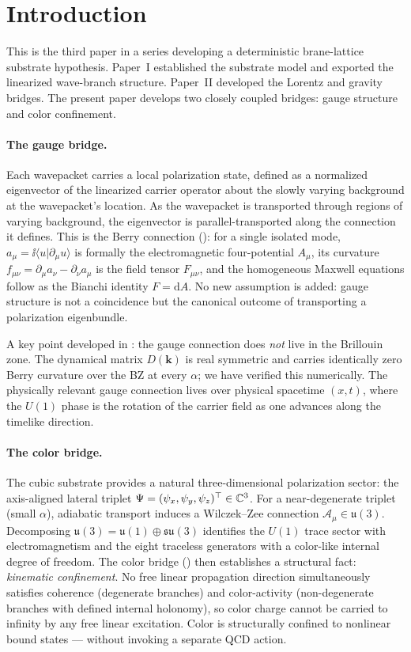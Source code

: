 \section{Introduction}
\label{sec:introduction}

This is the third paper in a series developing a deterministic brane-lattice substrate hypothesis.
Paper~I established the substrate model and exported the linearized wave-branch structure.
Paper~II developed the Lorentz and gravity bridges.
The present paper develops two closely coupled bridges: gauge structure and color confinement.

\paragraph{The gauge bridge.}
Each wavepacket carries a local polarization state, defined as a normalized eigenvector of the
linearized carrier operator about the slowly varying background at the wavepacket's location.
As the wavepacket is transported through regions of varying background, the eigenvector is
parallel-transported along the connection it defines.
This is the Berry connection (): for a single isolated mode,
$a_\mu = \ii\langle u|\partial_\mu u\rangle$ is formally the electromagnetic four-potential
$A_\mu$, its curvature $f_{\mu\nu} = \partial_\mu a_\nu - \partial_\nu a_\mu$ is the field tensor
$F_{\mu\nu}$, and the homogeneous Maxwell equations follow as the Bianchi identity $F = \mathrm{d}A$.
No new assumption is added: gauge structure is not a coincidence but the canonical outcome of
transporting a polarization eigenbundle.

A key point developed in : the gauge connection does \emph{not} live in the
Brillouin zone.
The dynamical matrix $D(\mathbf{k})$ is real symmetric and carries identically zero Berry curvature
over the BZ at every $\alpha$; we have verified this numerically.
The physically relevant gauge connection lives over physical spacetime $(x,t)$, where the $U(1)$
phase is the rotation of the carrier field as one advances along the timelike direction.

\paragraph{The color bridge.}
The cubic substrate provides a natural three-dimensional polarization sector: the axis-aligned
lateral triplet $\Psi=(\psi_x,\psi_y,\psi_z)^\top\in\mathbb{C}^3$.
For a near-degenerate triplet (small $\alpha$), adiabatic transport induces a Wilczek--Zee
connection $\mathcal{A}_\mu\in\mathfrak{u}(3)$.
Decomposing $\mathfrak{u}(3)=\mathfrak{u}(1)\oplus\mathfrak{su}(3)$ identifies the $U(1)$ trace
sector with electromagnetism and the eight traceless generators with a color-like internal degree of
freedom.
The color bridge () then establishes a structural fact: \emph{kinematic confinement}.
No free linear propagation direction simultaneously satisfies coherence (degenerate branches) and
color-activity (non-degenerate branches with defined internal holonomy), so color charge cannot be
carried to infinity by any free linear excitation.
Color is structurally confined to nonlinear bound states --- without invoking a separate QCD action.


